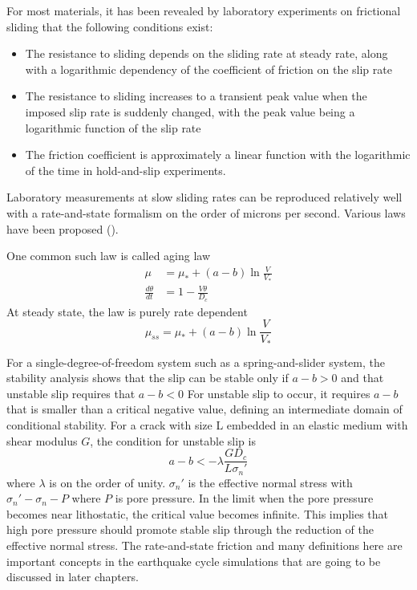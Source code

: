 For most materials, it has been revealed by laboratory experiments on frictional sliding that the following conditions exist:

\begin{itemize}
    \item The resistance to sliding depends on the sliding rate at steady rate, along with a logarithmic dependency of the coefficient of friction on the slip rate
    \item The resistance to sliding increases to a transient peak value when the imposed slip rate is suddenly changed, with the peak value being a logarithmic function of the slip rate
    \item The friction coefficient is approximately a linear function with the logarithmic of the time in hold-and-slip experiments.
\end{itemize}

Laboratory measurements at slow sliding rates can be reproduced relatively well with a rate-and-state formalism on the order of microns per second.
Various laws have been proposed (\cite{https://doi.org/10.1029/JB084iB05p02161, https://doi.org/10.1029/JB084iB05p02169,https://doi.org/10.1029/JB088iB12p10359,annurev:/content/journals/10.1146/annurev.earth.26.1.643}).

One common such law is called aging law
\begin{align}
    \mu &= \mu_* + (a - b) \ln \frac{V}{V_*} \\
    \frac{d\theta}{dt} &= 1 - \frac{V\theta}{D_c}
\end{align}
At steady state, the law is purely rate dependent
\begin{equation}
    \mu_{ss} = \mu_{*} + (a - b) \ln \frac{V}{V_*}
\end{equation}

For a single-degree-of-freedom system such as a spring-and-slider system, the stability analysis shows that the slip can be stable only if $a - b > 0$ and that unstable slip requires that $a - b < 0$  
For unstable slip to occur, it requires $a - b$ that is smaller than a critical negative value, defining an intermediate domain of conditional stability.
For a crack with size L embedded in an elastic medium with shear modulus $G$, the condition for unstable slip is 
\begin{equation}
    a - b < - \lambda \frac{GD_c}{L\sigma_n'}
\end{equation}
where $\lambda$ is on the order of unity. 
$\sigma_n'$ is the effective normal stress with $\sigma_n' - \sigma_n - P$ where $P$ is pore pressure.
In the limit when the pore pressure becomes near lithostatic, the critical value becomes infinite.
This implies that high pore pressure should promote stable slip through the reduction of the effective normal stress.
The rate-and-state friction and many definitions here are important concepts in the earthquake cycle simulations that are going to be discussed in later chapters.

\cite{}